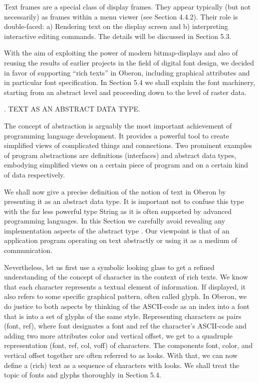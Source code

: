 Text frames are a special class of display frames. They appear
typically (but not necessarily) as frames within a menu viewer (see
Section 4.4.2). Their role is double-faced: a) Rendering text on the
display screen and b) interpreting interactive editing commands. The
details will be discussed in Section 5.3.

With the aim of exploiting the power of modern bitmap-displays and
also of reusing the results of earlier projects in the field of
digital font design, we decided in favor of supporting ``rich texts'' in
Oberon, including graphical attributes and in particular font
specification. In Section 5.4 we shall explain the font machinery,
starting from an abstract level and proceeding down to the level of
raster data.

. TEXT AS AN ABSTRACT DATA TYPE.

The concept of abstraction is arguably the most important achievement
of programming language development. It provides a powerful tool to
create simplified views of complicated things and connections. Two
prominent examples of program abstractions are definitions
(interfaces) and abstract data types, embodying simplified views on a
certain piece of program and on a certain kind of data respectively.

We shall now give a precise definition of the notion of text in Oberon
by presenting it as an abstract data type. It is important not to
confuse this type with the far less powerful type String as it is
often supported by advanced programming languages. In this Section we
carefully avoid revealing any implementation aspects of the abstract
type . Our viewpoint is that of an application program operating
on text abstractly or using it as a medium of communication.

Nevertheless, let us first use a symbolic looking glass to get a
refined understanding of the concept of character in the context of
rich texts. We know that each character represents a textual element
of information. If displayed, it also refers to some specific
graphical pattern, often called glyph. In Oberon, we do justice to
both aspects by thinking of the ASCII-code as an index into a font
that is into a set of glyphs of the same style. Representing
characters as pairs (font, ref), where font designates a font and ref
the character's ASCII-code and adding two more attributes color and
vertical offset, we get to a quadruple representation (font, ref, col,
voff) of characters. The components font, color, and vertical offset
together are often referred to as looks. With that, we can now define
a (rich) text as a sequence of characters with looks. We shall treat
the topic of fonts and glyphs thoroughly in Section 5.4.

